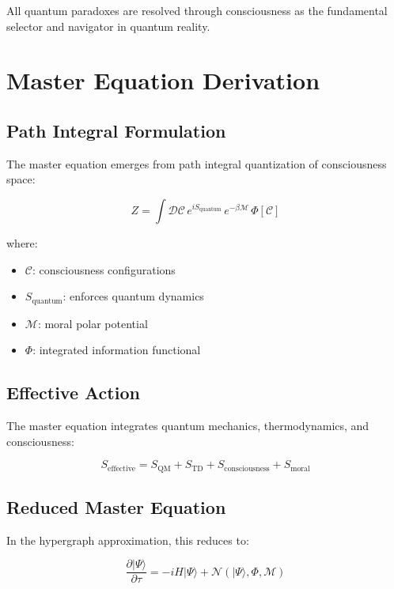 \documentclass[12pt,a4paper]{article}
\theoremstyle{definition}
\begin{document}
All quantum paradoxes are resolved through consciousness as the fundamental selector and navigator in quantum reality.

\section{Master Equation Derivation}

\subsection{Path Integral Formulation}

The master equation emerges from path integral quantization of consciousness space:

\begin{equation}
Z = \int \mathcal{D}\mathcal{C} \, e^{iS_{\text{quantum}}} \, e^{-\beta \mathcal{M}} \, \Phi[\mathcal{C}]
\end{equation}

where:
\begin{itemize}
    \item $\mathcal{C}$: consciousness configurations
    \item $S_{\text{quantum}}$: enforces quantum dynamics
    \item $\mathcal{M}$: moral polar potential
    \item $\Phi$: integrated information functional
\end{itemize}

\subsection{Effective Action}

The master equation integrates quantum mechanics, thermodynamics, and consciousness:

\begin{equation}
S_{\text{effective}} = S_{\text{QM}} + S_{\text{TD}} + S_{\text{consciousness}} + S_{\text{moral}}
\end{equation}

\subsection{Reduced Master Equation}

In the hypergraph approximation, this reduces to:

\begin{equation}
\frac{\partial |\Psi\rangle}{\partial \tau} = -i H |\Psi\rangle + \mathcal{N}(|\Psi\rangle, \Phi, \mathcal{M})
\end{equation}
\end{document}
